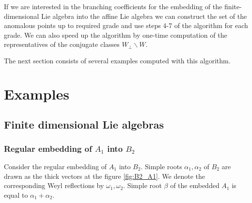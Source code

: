 \documentclass[a4paper,12pt]{article}
\theoremstyle{definition} \newtheorem{Def}{Definition}
\begin{document}
If we are interested in the branching coefficients for the embedding of the finite-dimensional Lie algebra into the affine Lie algebra we can construct the set of the anomalous points up to required grade and use steps 4-7 of the algorithm for each grade. We can also speed up the algorithm by one-time computation of the representatives of the conjugate classes $W_{\bot}\backslash W$.

The next section consists of several examples computed with this algorithm. 

\section{Examples}
\label{sec:examples}

\subsection{Finite dimensional Lie algebras}
\label{sec:finite-dimens-lie}

\subsubsection{Regular embedding of $A_1$ into $B_2$}
\label{sec:regul-embedd-a_1}

Consider the regular embedding of $A_1$ into $B_2$. Simple roots $\alpha_1, \alpha_2$ of $B_2$ are drawn as the thick vectors at the figure \ref{fig:B2_A1}. We denote the corresponding Weyl reflections by $\omega_1, \omega_2$. Simple root $\beta$ of the embedded $A_1$ is equal to $\alpha_1+\alpha_2$.
\end{document}
